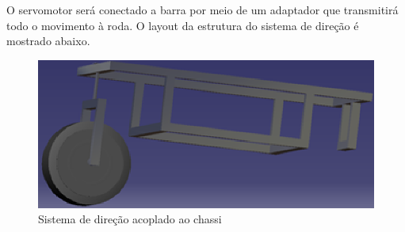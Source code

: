     O servomotor será conectado a barra por meio de um adaptador que transmitirá todo o movimento à roda. O layout da estrutura do sistema de direção é mostrado abaixo. 
    
        \begin{figure}[!htbp]
        	\begin{center}
        		\includegraphics[keepaspectratio=true,scale=1]{figuras/direcao1.eps}
        		\caption{Sistema de direção acoplado ao chassi}
        	\end{center}
        \end{figure}
    
